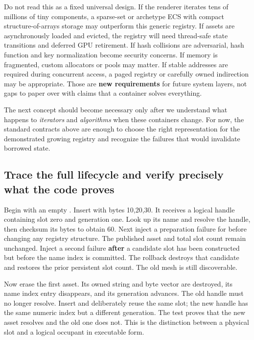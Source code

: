 Do not read this as a fixed universal design. If the renderer iterates tens of millions of tiny components, a sparse-set or archetype ECS with compact structure-of-arrays storage may outperform this generic registry. If assets are asynchronously loaded and evicted, the registry will need thread-safe state transitions and deferred GPU retirement. If hash collisions are adversarial, hash function and key normalization become security concerns. If memory is fragmented, custom allocators or pools may matter. If stable addresses are required during concurrent access, a paged registry or carefully owned indirection may be appropriate. Those are \textbf{new requirements} for future system layers, not gaps to paper over with claims that a container solves everything.

The next concept should become necessary only after we understand what happens to \emph{iterators} and \emph{algorithms} when these containers change. For now, the standard contracts above are enough to choose the right representation for the demonstrated growing registry and recognize the failures that would invalidate borrowed state.

\subsection{Trace the full lifecycle and verify precisely what the code proves}\label{05-engine-i-ch005-trace-the-full-lifecycle-and-verify-precisely-what-the-code-proves}

\hypertarget{05-engine-i-ch005-trace-the-full-lifecycle-and-verify-precisely-what-the-code-proves}{}

Begin with an empty . Insert  with bytes 10,20,30. It receives a logical handle containing slot zero and generation one. Look up its name and resolve the handle, then checksum its bytes to obtain 60. Next inject a preparation failure for  before changing any registry structure. The published asset and total slot count remain unchanged. Inject a second failure \textbf{after} a candidate slot has been constructed but before the name index is committed. The rollback destroys that candidate and restores the prior persistent slot count. The old mesh is still discoverable.

Now erase the first asset. Its owned string and byte vector are destroyed, its name index entry disappears, and its generation advances. The old handle must no longer resolve. Insert  and deliberately reuse the same slot; the new handle has the same numeric index but a different generation. The test proves that the new asset resolves and the old one does not. This is the distinction between a physical slot and a logical occupant in executable form.

